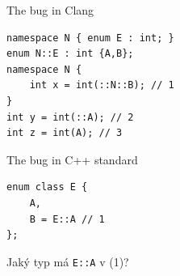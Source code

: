 \documentclass[11pt]{beamer}
\newcommand{\backupend}{
   \setcounter{framenumber}{\value{finalframe}}
}
\begin{document}
%
\begin{frame}[fragile=singleslide]{The bug in Clang}
\begin{lstlisting}
namespace N { enum E : int; }
enum N::E : int {A,B};
namespace N {
    int x = int(::N::B); // 1
}
int y = int(::A); // 2
int z = int(A); // 3
\end{lstlisting}
\end{frame}

\begin{frame}[fragile=singleslide]{The bug in C++ standard}
\begin{lstlisting}
enum class E {
    A,
    B = E::A // 1
};
\end{lstlisting}
Jaký typ má \lstinline|E::A| v (1)?
\end{frame}

\backupend
\end{document}
